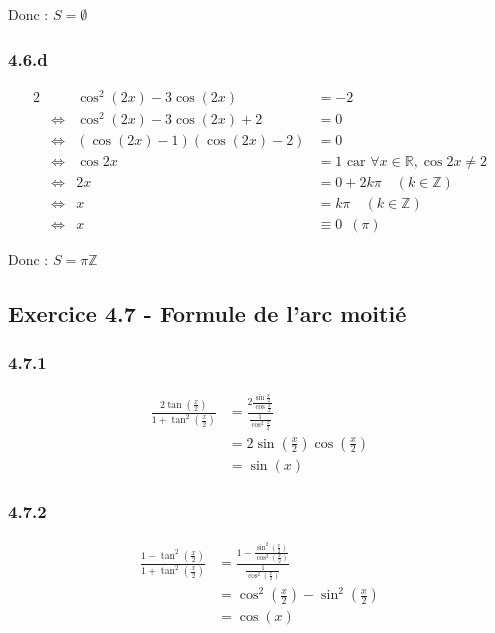 \documentclass[a4paper,10pt]{report}
\begin{document}
Donc : $S = \emptyset$

\subsubsection*{4.6.d}
\begin{alignat*}{2}
	&                    &        \cos^2(2x) -3\cos(2x) &= -2 \\
	&\Longleftrightarrow &    \cos^2(2x) -3\cos(2x) + 2 &= 0  \\
	&\Longleftrightarrow & (\cos(2x) - 1)(\cos(2x) - 2) &= 0  \\
	&\Longleftrightarrow &                      \cos 2x &= 1  \text{ car } \forall x \in \mathbb{R}, \cos 2x \neq 2\\
	&\Longleftrightarrow &                           2x &= 0 + 2k\pi \quad (k \in \mathbb{Z}) \\
	&\Longleftrightarrow &                           x  &= k\pi \quad (k \in \mathbb{Z}) \\	
	&\Longleftrightarrow &                            x &\equiv 0 \enspace \left( \pi \right)
\end{alignat*}

Donc : $S =  \pi\mathbb{Z}$

\subsection*{Exercice 4.7 - Formule de l'arc moitié}

\subsubsection*{4.7.1}
\begin{equation*}
	\begin{split}
		\frac{2 \tan(\frac{x}{2})}{1 + \tan^2(\frac{x}{2})} 
			&= \frac{2\frac{\sin\frac{x}{2}}{\cos \frac{x}{2}}}{\frac{1}{\cos^2 \frac{x}{2}}} \\
			&= 2 \sin(\frac{x}{2})\cos(\frac{x}{2}) \\
			&= \sin(x)
	\end{split}
\end{equation*}

\subsubsection*{4.7.2}
\begin{equation*}
	\begin{split}
		\frac{1 - \tan^2(\frac{x}{2})}{1 + \tan^2(\frac{x}{2})} 
		&= \frac{1 - \frac{\sin^2(\frac{x}{2})}{\cos^2(\frac{x}{2})}}{\frac{1}{\cos^2(\frac{x}{2})}} \\
		&= \cos^2(\frac{x}{2}) - \sin^2(\frac{x}{2}) \\
		&= \cos(x)
	\end{split}
\end{equation*}
\end{document}
